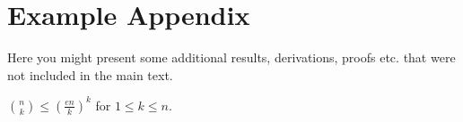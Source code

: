 \chapter{Example Appendix}

Here you might present some additional results, derivations, proofs etc. that were not included in the main text.

\begin{proposition}\label{ap:prop:binom}
    $\binom{n}{k} \leq \left(\frac{en}{k}\right)^k$ for $1 \leq k \leq n$. 
\end{proposition}
